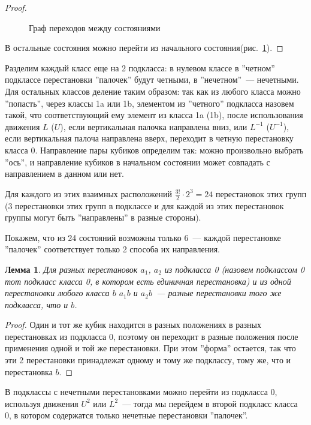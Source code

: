 \documentclass[utf8,a4paper,12pt]{article}
\newtheorem{lemma_cub}{Лемма}[section]
\begin{document}
\begin{proof}
\begin{figure}[ht]
\caption{Граф переходов между состояниями\label{states_graph}}
\end{figure}
В остальные состояния можно перейти из начального состояния(рис.~\ref{states_graph}).
\end{proof}
Разделим каждый класс еще на 2 подкласса: в нулевом классе в ''четном'' подклассе перестановки ''палочек''  будут четными, в ''нечетном''~--- нечетными. Для остальных классов деление таким образом: так как из любого класса можно ''попасть'', через классы 1a или 1b, элементом из ''четного'' подкласса назовем такой, что соответствующий ему элемент из класса 1a (1b), после использования движения $L$ ($U$), если вертикальная палочка направлена вниз, или $L^{-1}$ ($U^{-1}$), если вертикальная палоча направлена вверх, переходит в четную перестановку класса 0. Направление пары кубиков определим так: можно произвольно выбрать ''ось'', и направление кубиков в начальном состоянии может совпадать с направлением в данном или нет.

Для каждого из этих взаимных расположений $\frac{3!}{2}\cdot 2^3=24$ перестановок этих групп (3 перестановки этих групп в подклассе и для каждой из этих перестановок группы могут быть ''направлены'' в разные стороны).

Покажем, что из 24 состояний возможны только 6~--- каждой перестановке ''палочек'' соответствует только 2 способа их направления.
\begin{lemma_cub}
Для разных перестановок $a_1$, $a_2$ из подкласса 0 (назовем подклассом 0 тот подкласс класса 0, в котором есть единичная перестановка) и из одной перестановки любого класса $b$ $a_1b$ и $a_2b$~--- разные перестановки того же подкласса, что и $b$.\label{lemma_classes}
\end{lemma_cub}
\begin{proof}
Один и тот же кубик находится в разных положениях в разных перестановках из подкласса 0, поэтому он переходит в разные положения после применения одной и той же перестановки. При этом ''форма'' остается, так что эти 2 перестановки принадлежат одному и тому же подклассу, тому же, что и перестановка $b$.
\end{proof}
В подклассы с нечетными перестановками можно перейти из подкласса 0, используя движения $U^2$ или $L^2$~--- тогда мы перейдем в второй подкласс класса 0, в котором содержатся только нечетные перестановки ''палочек''.
\end{document}
